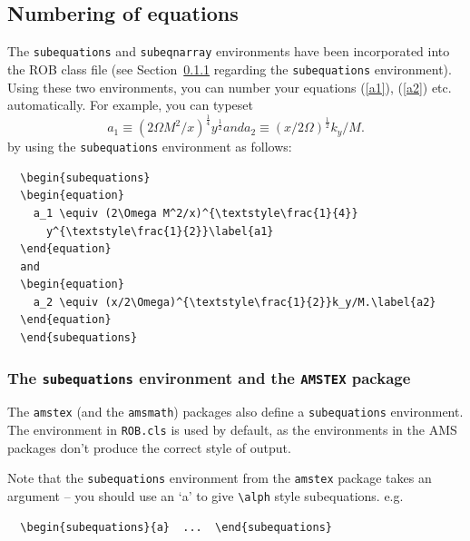 \documentclass[DTMColor]{ROB-New}
\begin{document}
\subsection{Numbering of equations}

The \verb"subequations" and \verb"subeqnarray" environments have been
incorporated into the ROB class file (see Section~\ref{sub:amstex} regarding
the \verb"subequations" environment). Using these two environments,
you can number your equations (\ref{a1}), (\ref{a2}) etc. automatically.
For example, you can typeset
  \begin{subequations}
  \begin{equation}
    a_1 \equiv (2\Omega M^2/x)^{\textstyle\frac{1}{4}}
      y^{\textstyle\frac{1}{2}}\label{a1}
  \end{equation}
  and
  \begin{equation}
    a_2 \equiv (x/2\Omega)^{\textstyle\frac{1}{2}}k_y/M.\label{a2}
  \end{equation}
  \end{subequations}
by using the \verb"subequations" environment as follows:
%
\begin{verbatim}
  \begin{subequations}
  \begin{equation}
    a_1 \equiv (2\Omega M^2/x)^{\textstyle\frac{1}{4}}
      y^{\textstyle\frac{1}{2}}\label{a1}
  \end{equation}
  and
  \begin{equation}
    a_2 \equiv (x/2\Omega)^{\textstyle\frac{1}{2}}k_y/M.\label{a2}
  \end{equation}
  \end{subequations}
\end{verbatim}

\subsubsection{The \texttt{subequations} environment and the
  \texttt{AMSTEX} package} \label{sub:amstex}

The \verb"amstex" (and the \verb"amsmath") packages also define a
\verb"subequations" environment.  The environment in \verb"ROB.cls" is used
by default, as the environments in the AMS packages don't produce the correct
style of output.

Note that the \verb"subequations" environment from the \verb"amstex" package
takes an argument -- you should use an `a' to give \verb"\alph" style
subequations. e.g.
\begin{verbatim}
  \begin{subequations}{a}  ...  \end{subequations}
\end{verbatim}
\end{document}
